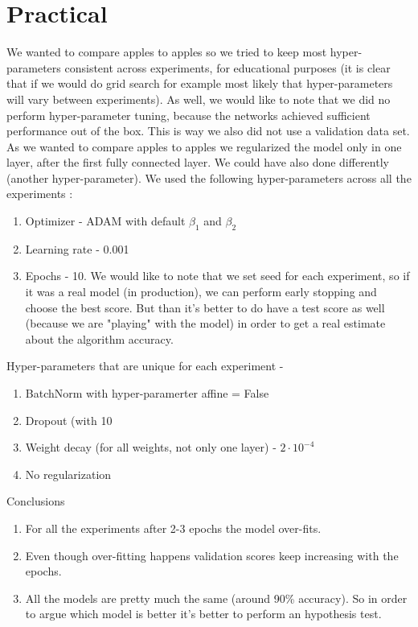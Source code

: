 \documentclass[10pt]{article}
\begin{document}
\newpage 

\section{Practical}
We wanted to compare apples to apples so we tried to keep most hyper-parameters consistent across experiments, for educational purposes (it is clear that if we would do grid search for example most likely that hyper-parameters will vary between experiments).
As well, we would like to note that we did no perform hyper-parameter tuning, because the networks achieved sufficient performance out of the box. This is way we also did not use a validation data set.\\
As we wanted to compare apples to apples we regularized the model only in one layer, after the first fully connected layer. We could have also done differently (another hyper-parameter).
We used the following hyper-parameters across all the experiments :
\begin{enumerate}[label=(\alph*)]
\item Optimizer - ADAM with default $\beta_1$ and $\beta_2$
\item Learning rate - 0.001
\item Epochs - 10. We would like to note that we set seed for each experiment, so if it was a real model (in production), we can perform early stopping and choose the best score. But than it's better to do have a test score as well (because we are "playing" with the model) in order to get a real estimate about the algorithm accuracy. 
\end{enumerate}

Hyper-parameters that are unique for each experiment - 
\begin{enumerate}[]
\item BatchNorm with hyper-paramerter affine = False
\item Dropout (with 10%
\item Weight decay (for all weights, not only one layer) - $2 \cdot 10^{-4}$
\item No regularization
\end{enumerate}

Conclusions
\begin{enumerate}[label=(\alph*)]
\item For all the experiments after 2-3 epochs the model over-fits. 
\item Even though over-fitting happens validation scores keep increasing with the epochs. 
\item All the models are pretty much the same (around 90\% accuracy). So in order to argue which model is better it's better to perform an hypothesis test.
\end{enumerate}
\end{document}
